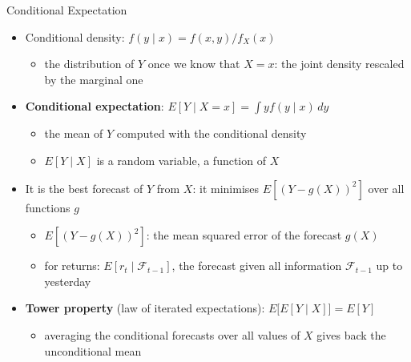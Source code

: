 \begin{frame}{Conditional Expectation}
\itemsize{\footnotesize}
\begin{itemize}
    \item Conditional density: $f(y \mid x) = f(x, y)/f_X(x)$
    \begin{itemize}
        \item the distribution of $Y$ once we know that $X = x$: the joint density rescaled by the marginal one
    \end{itemize}
    \item \textbf{Conditional expectation}: $E[Y \mid X = x] = \int y f(y \mid x)\,dy$
    \begin{itemize}
        \item the mean of $Y$ computed with the conditional density
        \item $E[Y \mid X]$ is a random variable, a function of $X$
    \end{itemize}
    \item It is the best forecast of $Y$ from $X$: it minimises $E[(Y - g(X))^2]$ over all functions $g$
    \begin{itemize}
        \item $E[(Y - g(X))^2]$: the mean squared error of the forecast $g(X)$
        \item for returns: $E[r_t \mid \mathcal{F}_{t-1}]$, the forecast given all information $\mathcal{F}_{t-1}$ up to yesterday
    \end{itemize}
    \item \textbf{Tower property} (law of iterated expectations): $E\big[E[Y \mid X]\big] = E[Y]$
    \begin{itemize}
        \item averaging the conditional forecasts over all values of $X$ gives back the unconditional mean
    \end{itemize}
\end{itemize}
\end{frame}

